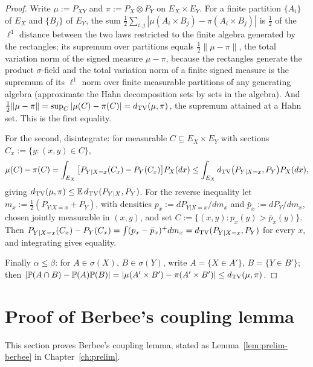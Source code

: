 \documentclass[../../main.tex]{subfiles}
\begin{document}
\begin{proof}
Write $\mu:=P_{XY}$ and $\pi:=P_X\otimes P_Y$ on $E_X\times E_Y$. For a finite partition $\{A_i\}$ of $E_X$ and $\{B_j\}$ of $E_Y$, the sum $\tfrac12\sum_{i,j}|\mu(A_i\times B_j)-\pi(A_i\times B_j)|$ is $\tfrac12$ of the $\ell^1$ distance between the two laws restricted to the finite algebra generated by the rectangles; its supremum over partitions equals $\tfrac12\|\mu-\pi\|$, the total variation norm of the signed measure $\mu-\pi$, because the rectangles generate the product $\sigma$-field and the total variation norm of a finite signed measure is the supremum of its $\ell^1$ norm over finite measurable partitions of any generating algebra (approximate the Hahn decomposition sets by sets in the algebra). And $\tfrac12\|\mu-\pi\|=\sup_C|\mu(C)-\pi(C)|=d_{\mathrm{TV}}(\mu,\pi)$, the supremum attained at a Hahn set. This is the first equality.

For the second, disintegrate: for measurable $C\subseteq E_X\times E_Y$ with sections $C_x:=\{y:(x,y)\in C\}$,
\[
\mu(C)-\pi(C)=\int_{E_X}\big[P_{Y|X=x}(C_x)-P_Y(C_x)\big]P_X(dx)\le\int_{E_X}d_{\mathrm{TV}}\big(P_{Y|X=x},P_Y\big)P_X(dx),
\]
giving $d_{\mathrm{TV}}(\mu,\pi)\le\mathbb{E}\,d_{\mathrm{TV}}(P_{Y|X},P_Y)$. For the reverse inequality let $m_x:=\tfrac12(P_{Y|X=x}+P_Y)$, with densities $p_x:=dP_{Y|X=x}/dm_x$ and $\bar p_x:=dP_Y/dm_x$, chosen jointly measurable in $(x,y)$, and set $C:=\{(x,y):p_x(y)>\bar p_x(y)\}$. Then $P_{Y|X=x}(C_x)-P_Y(C_x)=\int(p_x-\bar p_x)^+dm_x=d_{\mathrm{TV}}(P_{Y|X=x},P_Y)$ for every $x$, and integrating gives equality.

Finally $\alpha\le\beta$: for $A\in\sigma(X)$, $B\in\sigma(Y)$, write $A=\{X\in A'\}$, $B=\{Y\in B'\}$; then $|\mathbb{P}(A\cap B)-\mathbb{P}(A)\mathbb{P}(B)|=|\mu(A'\times B')-\pi(A'\times B')|\le d_{\mathrm{TV}}(\mu,\pi)$.
\end{proof}

\section{Proof of Berbee's coupling lemma}\label{appB:berbee}

This section proves Berbee's coupling lemma, stated as Lemma~\ref{lem:prelim-berbee} in Chapter~\ref{ch:prelim}.
\end{document}
